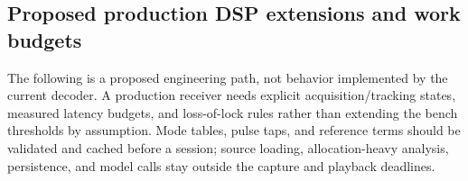 
\subsection{Proposed production DSP extensions and work budgets}
The following is a proposed engineering path, not behavior implemented by the
current decoder. A production receiver needs explicit acquisition/tracking
states, measured latency budgets, and loss-of-lock rules rather than extending
the bench thresholds by assumption. Mode tables, pulse taps, and reference
terms should be validated and cached before a session; source loading,
allocation-heavy analysis, persistence, and model calls stay outside the
capture and playback deadlines.

